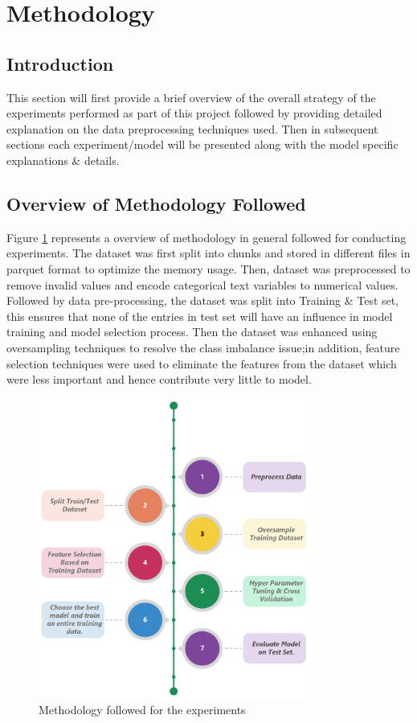 \documentclass[twoside,11pt,a4paper]{article}
\begin{document}
\vfill
\clearpage
\section{Methodology}\label{sec:methodology}
\subsection{Introduction}
This section will first provide a brief overview of the overall strategy of the experiments performed as part of this project followed by  providing detailed explanation on the data preprocessing techniques used. Then in subsequent sections each experiment/model will be presented along with the model specific explanations \& details.
\vfill
\clearpage
\subsection{Overview of Methodology Followed}
Figure \ref{fig:methodology} represents a overview of methodology in general followed for conducting experiments. The dataset was first split into chunks and stored in different files in parquet format to optimize the memory usage. Then, dataset was preprocessed to remove invalid values and encode categorical text variables to numerical values. Followed by data pre-processing, the dataset was split into Training \& Test set, this ensures that none of the entries in test set will have an influence in model training and model selection process. Then the dataset was enhanced using oversampling techniques to resolve the class imbalance issue;in addition, feature selection techniques were used to eliminate the features from the dataset which were less important and hence contribute very little to model. 
\begin{figure}[ht]
	\centering
	\includegraphics[width=0.8\textwidth, height=0.5\textheight]{methodology}
	\caption[Methodology]{Methodology followed for the experiments}
	\label{fig:methodology}
\end{figure}
\end{document}
